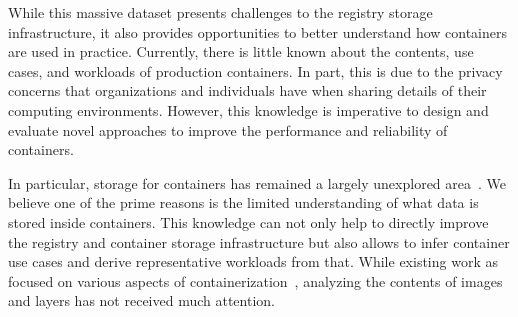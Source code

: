 While this massive dataset presents challenges to the registry storage
infrastructure, it also provides opportunities to better understand how
containers are used in practice.
%
Currently, there is little known about the contents, use cases, and workloads
of production containers.
%
In part, this is due to the privacy concerns that organizations and individuals
have when sharing details of their computing environments.
%
However, this knowledge is imperative to design and evaluate novel approaches
to improve the performance and reliability of containers.




In particular, storage for containers has remained a largely unexplored
area~\cite{login-container-storage-options}.
%
We believe one of the prime reasons is the limited understanding of what data
is stored inside containers.
%
This knowledge can not only help to directly improve the registry and container
storage infrastructure but also allows to infer container use cases and derive
representative workloads from that.
%
While existing work as focused on various aspects of
containerization~\cite{slacker, dockervulnerabile, dockerfinder, analysisdockergithub, dockerssd}, analyzing the
contents of images and layers has not received much attention.




%
%
%


%




